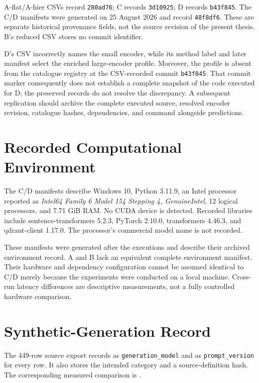 A-flat/A-hier CSVs record \texttt{280ad76}; C records
\texttt{3d10925}; D records \texttt{b43f845}. The C/D manifests were
generated on 25 August 2026 and record \texttt{48f8df6}. These are separate
historical provenance fields, not the source revision of the present
thesis. B's reduced CSV stores no commit identifier.

D's CSV incorrectly names the small encoder, while its method label
and later manifest select the enriched large-encoder profile.
Moreover, the profile is absent from the catalogue registry at the
CSV-recorded commit \texttt{b43f845}. That commit marker consequently
does not establish a complete snapshot of the code executed for D;
the preserved records do not resolve the discrepancy. A subsequent
replication should archive the complete executed source, resolved encoder
revision, catalogue hashes, dependencies, and command alongside predictions.

\section{Recorded Computational Environment}

The C/D manifests describe Windows 10, Python 3.11.9, an Intel processor
reported as \emph{Intel64 Family 6 Model 154 Stepping 4, GenuineIntel},
12 logical processors, and 7.71 GiB RAM. No CUDA device is detected.
Recorded libraries include sentence-transformers 5.2.3, PyTorch 2.10.0,
transformers 4.46.3, and qdrant-client 1.17.0. The processor's commercial
model name is not recorded.

These manifests were generated after the executions and describe their
archived environment record. A and B lack an equivalent complete
environment manifest. Their hardware and dependency configuration
cannot be assumed identical to C/D merely because the experiments were
conducted on a local machine. Cross-run latency differences are descriptive
measurements, not a fully controlled hardware comparison.

\section{Synthetic-Generation Record}

The 449-row source export
records  as
\texttt{generation\_model} and
 as \texttt{prompt\_version}
for every row. It also stores the intended category and a source-definition
hash. The corresponding measured comparison is
.

